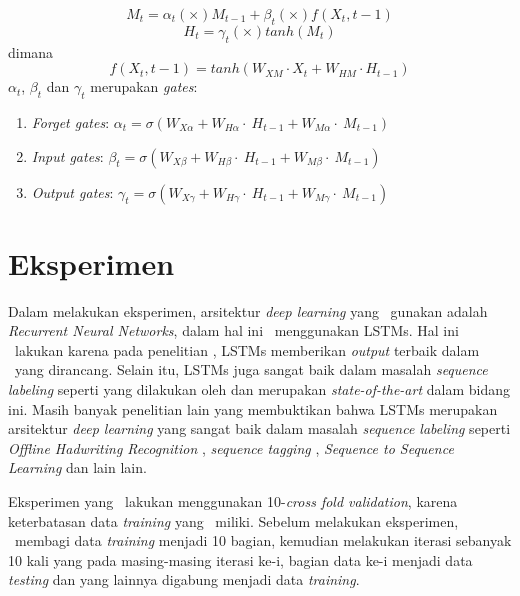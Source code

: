 \begin{enumerate}
	\begin{equation}\label{eq:mt3}
	M_{t}=\alpha_{t} (\times) M_{t-1} + \beta_{t} (\times) f(X_{t},{t-1})
	\end{equation}
	\begin{equation}\label{eq:ht3}
	H_{t}=\gamma_{t} (\times) tanh(M_{t})
	\end{equation}
	dimana
	\begin{equation}\label{eq:hf3}
	f(X_{t},{t-1})=tanh(W_{XM} \cdot X_{t} + W_{HM} \cdot H_{t-1})
	\end{equation}
	$ \alpha_{t} $, $ \beta_{t} $ dan $ \gamma_{t} $ merupakan \textit{gates}:
	\begin{enumerate}
	\item \textit{Forget gates}: $ \alpha_{t}=\sigma(W_{X\alpha}+W_{H\alpha}\cdot~H_{t-1}+W_{M\alpha}\cdot~M_{t-1}) $
	\item \textit{Input gates}: $ \beta_{t}=\sigma(W_{X\beta}+W_{H\beta}\cdot~H_{t-1}+W_{M\beta}\cdot~M_{t-1}) $
	\item \textit{Output gates}: $ \gamma_{t}=\sigma(W_{X\gamma}+W_{H\gamma}\cdot~H_{t-1}+W_{M\gamma}\cdot~M_{t-1}) $
	\end{enumerate}
		
\end{enumerate}
	
\section{Eksperimen}
Dalam melakukan eksperimen, arsitektur \textit{deep learning} yang \saya~gunakan adalah \textit{Recurrent Neural Networks}, dalam hal ini \saya~menggunakan LSTMs. Hal ini \saya~lakukan karena pada penelitian \cite{mujiono2016new}, LSTMs memberikan \textit{output} terbaik dalam \mer~yang dirancang. Selain itu, LSTMs juga sangat baik dalam masalah \textit{sequence labeling} seperti yang dilakukan oleh \cite{graves2013speech} dan merupakan \textit{state-of-the-art} dalam bidang ini. Masih banyak penelitian lain yang membuktikan bahwa LSTMs merupakan arsitektur \textit{deep learning} yang sangat baik dalam masalah \textit{sequence labeling} seperti \textit{Offline Hadwriting Recognition} \citep{graves2009offline}, \textit{sequence tagging} \citep{huang2015bidirectional}, \textit{Sequence to Sequence Learning} \citep{NIPS2014_5346} dan lain lain.

Eksperimen yang \saya~lakukan menggunakan 10-\textit{cross fold validation}, karena keterbatasan data \textit{training} yang \saya~miliki. Sebelum melakukan eksperimen, \saya~membagi data \textit{training} menjadi 10 bagian, kemudian melakukan iterasi sebanyak 10 kali yang pada masing-masing iterasi ke-i, bagian data ke-i menjadi data \textit{testing} dan yang lainnya digabung menjadi data \textit{training}. 

